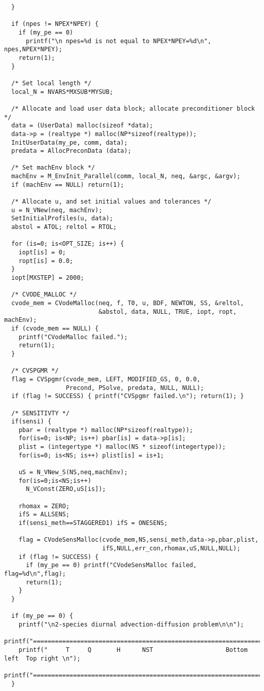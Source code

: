 \begin{verbatim}
  }

  if (npes != NPEX*NPEY) {
    if (my_pe == 0)
      printf("\n npes=%d is not equal to NPEX*NPEY=%d\n", npes,NPEX*NPEY);
    return(1);
  }

  /* Set local length */
  local_N = NVARS*MXSUB*MYSUB;

  /* Allocate and load user data block; allocate preconditioner block */
  data = (UserData) malloc(sizeof *data);
  data->p = (realtype *) malloc(NP*sizeof(realtype));
  InitUserData(my_pe, comm, data);
  predata = AllocPreconData (data);

  /* Set machEnv block */
  machEnv = M_EnvInit_Parallel(comm, local_N, neq, &argc, &argv);
  if (machEnv == NULL) return(1);

  /* Allocate u, and set initial values and tolerances */ 
  u = N_VNew(neq, machEnv);
  SetInitialProfiles(u, data);
  abstol = ATOL; reltol = RTOL;

  for (is=0; is<OPT_SIZE; is++) {
    iopt[is] = 0;
    ropt[is] = 0.0;
  }
  iopt[MXSTEP] = 2000;

  /* CVODE_MALLOC */
  cvode_mem = CVodeMalloc(neq, f, T0, u, BDF, NEWTON, SS, &reltol,
                          &abstol, data, NULL, TRUE, iopt, ropt, machEnv);
  if (cvode_mem == NULL) {
    printf("CVodeMalloc failed.");
    return(1);
  }

  /* CVSPGMR */
  flag = CVSpgmr(cvode_mem, LEFT, MODIFIED_GS, 0, 0.0, 
                 Precond, PSolve, predata, NULL, NULL);
  if (flag != SUCCESS) { printf("CVSpgmr failed.\n"); return(1); }

  /* SENSITIVTY */
  if(sensi) {
    pbar = (realtype *) malloc(NP*sizeof(realtype));
    for(is=0; is<NP; is++) pbar[is] = data->p[is];
    plist = (integertype *) malloc(NS * sizeof(integertype));
    for(is=0; is<NS; is++) plist[is] = is+1;

    uS = N_VNew_S(NS,neq,machEnv);
    for(is=0;is<NS;is++)
      N_VConst(ZERO,uS[is]);

    rhomax = ZERO;
    ifS = ALLSENS;
    if(sensi_meth==STAGGERED1) ifS = ONESENS;

    flag = CVodeSensMalloc(cvode_mem,NS,sensi_meth,data->p,pbar,plist,
                           ifS,NULL,err_con,rhomax,uS,NULL,NULL);
    if (flag != SUCCESS) {
      if (my_pe == 0) printf("CVodeSensMalloc failed, flag=%d\n",flag);
      return(1);
    }
  }

  if (my_pe == 0) {
    printf("\n2-species diurnal advection-diffusion problem\n\n");
    printf("========================================================================\n");
    printf("     T     Q       H      NST                    Bottom left  Top right \n");
    printf("========================================================================\n");
  }


\end{verbatim}

